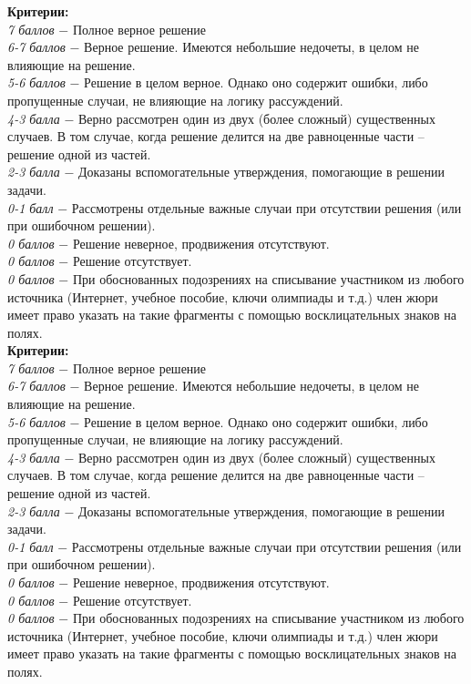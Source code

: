  \textbf{Критерии:} \\
\textit{7 баллов} $-$ Полное верное решение\\
\textit{6-7 баллов} $-$ Верное решение. Имеются небольшие недочеты, в целом не влияющие на решение.\\
\textit{5-6 баллов} $-$ Решение в целом верное. Однако оно содержит ошибки, либо пропущенные случаи, не влияющие на логику рассуждений.\\
\textit{4-3 балла} $-$ Верно рассмотрен один из двух (более сложный) существенных случаев. В том случае, когда решение делится на две равноценные части – решение одной из частей. 
\\
\textit{2-3 балла} $-$ Доказаны вспомогательные утверждения, помогающие в решении задачи.
\\
\textit{0-1 балл} $-$ Рассмотрены отдельные важные случаи при отсутствии решения (или при ошибочном решении).
\\
\textit{0 баллов} $-$ Решение неверное, продвижения отсутствуют.\\
\textit{0 баллов} $-$ Решение отсутствует.
\\
\textit{0 баллов} $-$ При обоснованных подозрениях на списывание участником из любого источника (Интернет, учебное пособие, ключи олимпиады и т.д.) член жюри имеет право указать на такие фрагменты с помощью восклицательных знаков на полях. \\

 \textbf{Критерии:} \\
\textit{7 баллов} $-$ Полное верное решение\\
\textit{6-7 баллов} $-$ Верное решение. Имеются небольшие недочеты, в целом не влияющие на решение.\\
\textit{5-6 баллов} $-$ Решение в целом верное. Однако оно содержит ошибки, либо пропущенные случаи, не влияющие на логику рассуждений.\\
\textit{4-3 балла} $-$ Верно рассмотрен один из двух (более сложный) существенных случаев. В том случае, когда решение делится на две равноценные части – решение одной из частей. 
\\
\textit{2-3 балла} $-$ Доказаны вспомогательные утверждения, помогающие в решении задачи.
\\
\textit{0-1 балл} $-$ Рассмотрены отдельные важные случаи при отсутствии решения (или при ошибочном решении).
\\
\textit{0 баллов} $-$ Решение неверное, продвижения отсутствуют.\\
\textit{0 баллов} $-$ Решение отсутствует.
\\
\textit{0 баллов} $-$ При обоснованных подозрениях на списывание участником из любого источника (Интернет, учебное пособие, ключи олимпиады и т.д.) член жюри имеет право указать на такие фрагменты с помощью восклицательных знаков на полях. \\